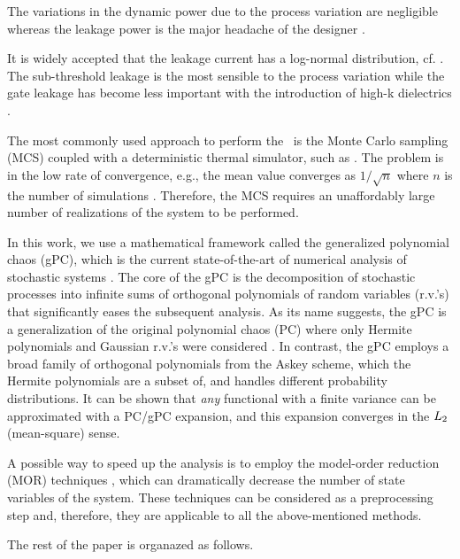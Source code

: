 The variations in the dynamic power due to the process variation are negligible whereas the leakage power is the major headache of the designer \cite{juan2012, srivastava2010}.

It is widely accepted that the leakage current has a log-normal distribution, cf. \cite{juan2012, srivastava2010}. The sub-threshold leakage is the most sensible to the process variation while the gate leakage has become less important with the introduction of high-k dielectrics \cite{juan2012}.

The most commonly used approach to perform the \sta\ is the Monte Carlo sampling (MCS) coupled with a deterministic thermal simulator, such as \cite{huang2006}. The problem is in the low rate of convergence, e.g., the mean value converges as $1/\sqrt{n}$ where $n$ is the number of simulations \cite{xiu2009}. Therefore, the MCS requires an unaffordably large number of realizations of the system to be performed.

In this work, we use a mathematical framework called the generalized polynomial chaos (gPC), which is the current state-of-the-art of numerical analysis of stochastic systems \cite{xiu2009, xiu2002}. The core of the gPC is the decomposition of stochastic processes into infinite sums of orthogonal polynomials of random variables (r.v.'s) that significantly eases the subsequent analysis. As its name suggests, the gPC is a generalization of the original polynomial chaos (PC) where only Hermite polynomials and Gaussian r.v.'s were considered \cite{ghanem1991}. In contrast, the gPC employs a broad family of orthogonal polynomials from the Askey scheme, which the Hermite polynomials are a subset of, and handles different probability distributions. It can be shown that \emph{any} functional with a finite variance can be approximated with a PC/gPC expansion, and this expansion converges in the $L_{2}$ (mean-square) sense.

A possible way to speed up the analysis is to employ the model-order reduction (MOR) techniques \cite{benner2011}, which can dramatically decrease the number of state variables of the system. These techniques can be considered as a preprocessing step and, therefore, they are applicable to all the above-mentioned methods.

The rest of the paper is organazed as follows.
